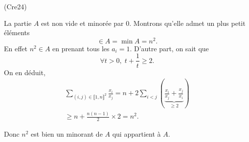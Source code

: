 \begin{tiny}(Cre24)\end{tiny} La partie $A$ est non vide et minorée par $0$. Montrons qu'elle admet un plus petit éléments
\[
  \in A = \min A = n^2.
\]
En effet $n^2 \in A$ en prenant tous les $a_i=1$. D'autre part, on sait que
\[
  \forall t >0, \; t + \frac{1}{t} \geq 2.
\]
On en déduit,
\begin{multline*}
  \sum_{(i,j)\in \llbracket 1,n\rrbracket^2} \frac{x_i}{x_j} 
  = n +  2\sum_{i < j} \left(\underset{ \geq 2}{\underbrace{\frac{x_i}{x_j} + \frac{x_j}{x_i}}}\right)\\
  \geq n + \frac{n(n-1)}{2}\times 2 = n^2.
\end{multline*}

Donc $n^2$ est bien un minorant de $A$ qui appartient à $A$.
